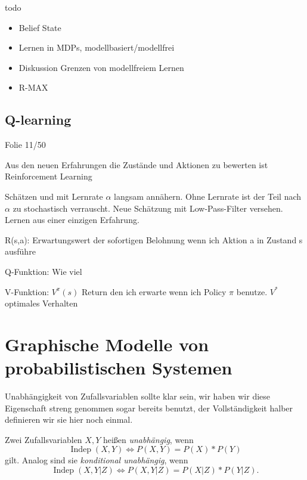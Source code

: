 \documentclass[ngerman]{../LaTeX-Templates/Paper/paper}
\newcommand{\independent}{\ensuremath{\operatorname{Indep}}}
\begin{document}
todo


\begin{itemize}
	\item Belief State
	\item Lernen in MDPs, modellbasiert/modellfrei
	\item Diskussion Grenzen von modellfreiem Lernen 
	\item R-MAX
\end{itemize}




\subsection{Q-learning} Folie 11/50



Aus den neuen Erfahrungen die Zustände und Aktionen zu bewerten ist Reinforcement Learning

Schätzen und mit Lernrate $\alpha$ langsam annähern. Ohne Lernrate ist der Teil nach $\alpha$ zu stochastisch verrauscht. Neue Schätzung mit Low-Pass-Filter versehen. Lernen aus einer einzigen Erfahrung.

R(s,a): Erwartungswert der sofortigen Belohnung wenn ich Aktion a in Zustand s ausführe

Q-Funktion: Wie viel 

V-Funktion: $V^\pi(s)$ Return den ich erwarte wenn ich Policy $\pi$ benutze. $V^\ast$ optimales Verhalten




















\section{Graphische Modelle von probabilistischen Systemen}











Unabhängigkeit von Zufallsvariablen sollte klar sein, wir haben wir diese Eigenschaft streng genommen sogar bereits benutzt, der Vollständigkeit halber definieren wir sie hier noch einmal.
\begin{definition}[Unabhängigkeit]
	Zwei Zufallsvariablen $X,Y$ heißen \emph{unabhängig}, wenn
	\begin{equation*}
		\independent(X,Y)\Longleftrightarrow P(X,Y)=P(X)*P(Y)
	\end{equation*}
	gilt. Analog sind sie \emph{konditional unabhängig}, wenn
	\begin{equation*}
		\independent(X,Y|Z)\Longleftrightarrow P(X,Y|Z)=P(X|Z)*P(Y|Z).
	\end{equation*}
\end{definition}
\end{document}
